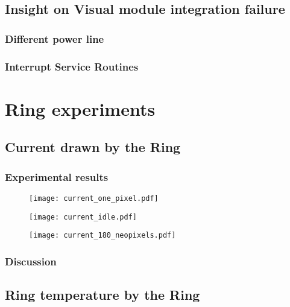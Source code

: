 \subsection{Insight on Visual module integration failure}\label{visual_fail}
\subsubsection{Different power line}
\subsubsection{Interrupt Service Routines}

\section{Ring experiments}

\subsection{Current drawn by the Ring}
\subsubsection{Experimental results}

\begin{figure}[ht]
	\centering
	\texttt{[image: current\_one\_pixel.pdf]}
	\caption{}
	\label{fig:current_one_pixel}
\end{figure}

\begin{figure}[ht]
	\centering
	\texttt{[image: current\_idle.pdf]}
	\caption{}
	\label{fig:current_idle}
\end{figure}

\begin{figure}[ht]
	\centering
	\texttt{[image: current\_180\_neopixels.pdf]}
	\caption{}
	\label{fig:current_180_neopixels}
\end{figure}

\subsubsection{Discussion}

\subsection{Ring temperature by the Ring}
